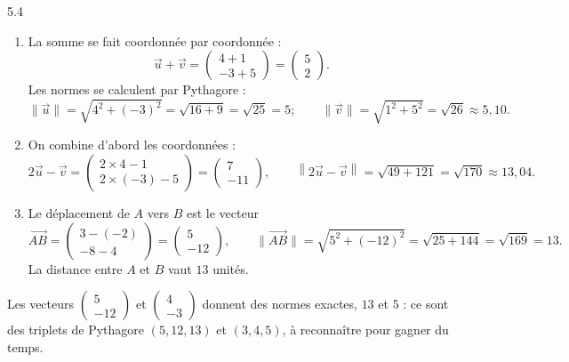\begin{corrige}{5.4}
\begin{enumerate}
\item La somme se fait coordonnée par coordonnée :
\[
\vec{u} + \vec{v} = \begin{pmatrix} 4 + 1 \\ -3 + 5 \end{pmatrix} = \begin{pmatrix} 5 \\ 2 \end{pmatrix}.
\]
Les normes se calculent par Pythagore :
\[
\|\vec{u}\| = \sqrt{4^{2} + (-3)^{2}} = \sqrt{16 + 9} = \sqrt{25} = 5 ;
\qquad
\|\vec{v}\| = \sqrt{1^{2} + 5^{2}} = \sqrt{26} \approx 5{,}10 .
\]
\item On combine d'abord les coordonnées :
\[
2\vec{u} - \vec{v} = \begin{pmatrix} 2 \times 4 - 1 \\ 2 \times (-3) - 5 \end{pmatrix} = \begin{pmatrix} 7 \\ -11 \end{pmatrix},
\qquad
\left\| 2\vec{u} - \vec{v} \right\| = \sqrt{49 + 121} = \sqrt{170} \approx 13{,}04 .
\]
\item Le déplacement de $A$ vers $B$ est le vecteur
\[
\overrightarrow{AB} = \begin{pmatrix} 3 - (-2) \\ -8 - 4 \end{pmatrix} = \begin{pmatrix} 5 \\ -12 \end{pmatrix},
\qquad
\|\overrightarrow{AB}\| = \sqrt{5^{2} + (-12)^{2}} = \sqrt{25 + 144} = \sqrt{169} = 13 .
\]
La distance entre $A$ et $B$ vaut $13$ unités.
\end{enumerate}
Les vecteurs $\begin{pmatrix} 5 \\ -12 \end{pmatrix}$ et $\begin{pmatrix} 4 \\ -3 \end{pmatrix}$ donnent des normes exactes, $13$ et $5$ : ce sont des triplets de Pythagore $(5, 12, 13)$ et $(3, 4, 5)$, à reconnaître pour gagner du temps.
\end{corrige}
